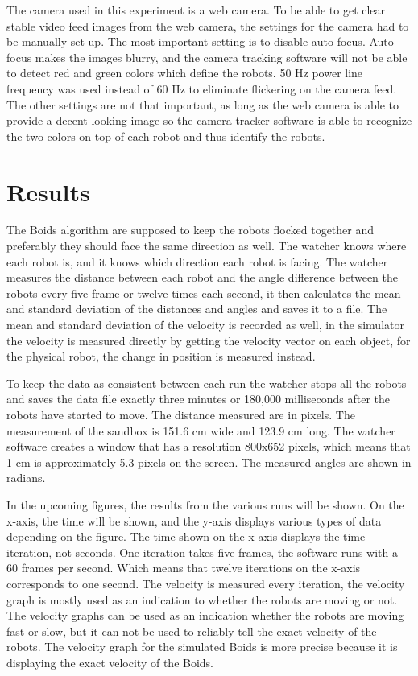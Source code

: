 The camera used in this experiment is a web camera. To be able to get clear stable video feed images from the web camera, the settings for the camera had to be manually set up.
The most important setting is to disable auto focus. Auto focus makes the images blurry, and the camera tracking software will not be able to detect red and green colors which define the robots. 50 Hz power line frequency was used instead of 60 Hz to eliminate flickering on the camera feed. The other settings are not that important, as long as the web camera is able to provide a decent looking image so the camera tracker software is able to recognize the two colors on top of each robot and thus identify the robots. 



\section{Results}
\label{sec:results}

The Boids algorithm are supposed to keep the robots flocked together and preferably they should face the same direction as well. The watcher knows where each robot is, and it knows which direction each robot is facing. The watcher measures the distance between each robot and the angle difference between the robots every five frame or twelve times each second, it then calculates the mean and standard deviation of the distances and angles and saves it to a file. The mean and standard deviation of the velocity is recorded as well, in the simulator the velocity is measured directly by getting the velocity vector on each object, for the physical robot, the change in position is measured instead.

To keep the data as consistent between each run the watcher stops all the robots and saves the data file exactly three minutes or 180,000 milliseconds after the robots have started to move.
The distance measured are in pixels. The measurement of the sandbox is 151.6 cm wide and 123.9 cm long. The watcher software creates a window that has a resolution 800x652 pixels, which means that 1 cm is approximately 5.3 pixels on the screen. The measured angles are shown in radians.

In the upcoming figures, the results from the various runs will be shown. On the x-axis, the time will be shown, and the y-axis displays various types of data depending on the figure. The time shown on the x-axis displays the time iteration, not seconds. One iteration takes five frames, the software runs with a 60 frames per second. Which means that twelve iterations on the x-axis corresponds to one second. The velocity is measured every iteration, the velocity graph is mostly used as an indication to whether the robots are moving or not. The velocity graphs can be used as an indication whether the robots are moving fast or slow, but it can not be used to reliably tell the exact velocity of the robots. The velocity graph for the simulated Boids is more precise because it is displaying the exact velocity of the Boids.

